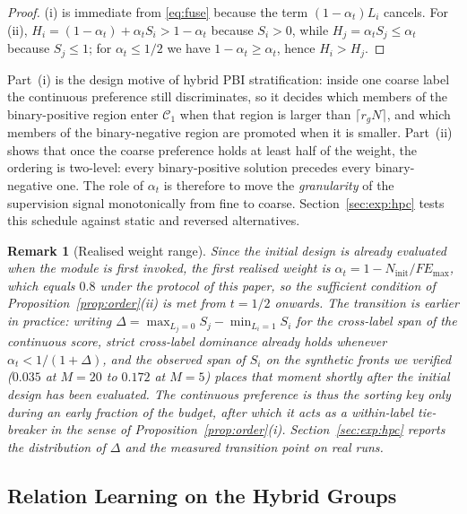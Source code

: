 \documentclass[final,5p,times,twocolumn]{elsarticle}
\newtheorem{remark}{Remark}
\begin{document}
\begin{proof}
(i) is immediate from \eqref{eq:fuse} because the term $(1-\alpha_t)L_i$
cancels. For (ii), $H_i=(1-\alpha_t)+\alpha_tS_i>1-\alpha_t$ because $S_i>0$,
while $H_j=\alpha_tS_j\leq\alpha_t$ because $S_j\leq1$; for
$\alpha_t\leq1/2$ we have $1-\alpha_t\geq\alpha_t$, hence $H_i>H_j$.
\end{proof}

Part~(i) is the design motive of hybrid PBI stratification: inside one coarse
label the continuous preference still discriminates, so it decides which
members of the binary-positive region enter $\mathcal{C}_1$ when that region is
larger than $\lceil r_gN\rceil$, and which members of the binary-negative
region are promoted when it is smaller. Part~(ii) shows that once the coarse
preference holds at least half of the weight, the ordering is two-level: every
binary-positive solution precedes every binary-negative one. The role of
$\alpha_t$ is therefore to move the \emph{granularity} of the supervision
signal monotonically from fine to coarse. Section~\ref{sec:exp:hpc} tests this
schedule against static and reversed alternatives.

\begin{remark}[Realised weight range]
\label{rem:alphafirst}
Since the initial design is already evaluated when the module is first invoked,
the first realised weight is $\alpha_t=1-N_{\mathrm{init}}/FE_{\max}$, which
equals $0.8$ under the protocol of this paper, so the sufficient condition of
Proposition~\ref{prop:order}(ii) is met from $t=1/2$ onwards. The transition is
earlier in practice: writing $\Delta=\max_{L_j=0}S_j-\min_{L_i=1}S_i$ for the
cross-label span of the continuous score, strict cross-label dominance already
holds whenever $\alpha_t<1/(1+\Delta)$, and the observed span of $S_i$ on the
synthetic fronts we verified ($0.035$ at $M=20$ to $0.172$ at $M=5$) places
that moment shortly after the initial design has been evaluated. The
continuous preference is thus the sorting key only during an early fraction of
the budget, after which it acts as a within-label tie-breaker in the sense of
Proposition~\ref{prop:order}(i). Section~\ref{sec:exp:hpc} reports the
distribution of $\Delta$ and the measured transition point on real runs.
\end{remark}

\subsection{Relation Learning on the Hybrid Groups}
\label{sec:method:relation}
\end{document}
